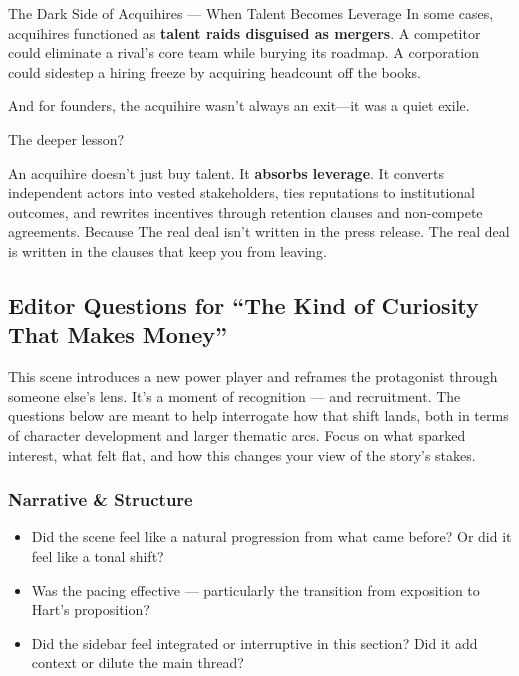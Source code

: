 \begin{HistoricalSidebar}{The Dark Side of Acquihires --- When Talent Becomes Leverage}
  In some cases, acquihires functioned as \textbf{talent raids disguised as mergers}. A competitor could eliminate a rival’s 
  core team while burying its roadmap. A corporation could sidestep a hiring freeze by acquiring headcount off the books.

  \medskip
  
  And for founders, the acquihire wasn’t always an exit—it was a quiet exile.
  
  \medskip
  
  The deeper lesson?

  \medskip
  
  An acquihire doesn’t just buy talent. It \textbf{absorbs leverage}. It converts independent actors into vested stakeholders, 
  ties reputations to institutional outcomes, and rewrites incentives through retention clauses and non-compete agreements.
  Because The real deal isn’t written in the press release.  The real deal is written in the clauses that keep you from leaving.
  
\end{HistoricalSidebar}


\subsection*{Editor Questions for ``The Kind of Curiosity That Makes Money''}

This scene introduces a new power player and reframes the protagonist through someone else’s lens. It’s a moment of recognition — and recruitment. The questions below are meant to help interrogate how that shift lands, both in terms of character development and larger thematic arcs. Focus on what sparked interest, what felt flat, and how this changes your view of the story’s stakes.

\subsubsection{Narrative \& Structure}

\begin{itemize}
  \item Did the scene feel like a natural progression from what came before? Or did it feel like a tonal shift?
  \item Was the pacing effective — particularly the transition from exposition to Hart’s proposition?
  \item Did the sidebar feel integrated or interruptive in this section? Did it add context or dilute the main thread?
\end{itemize}

